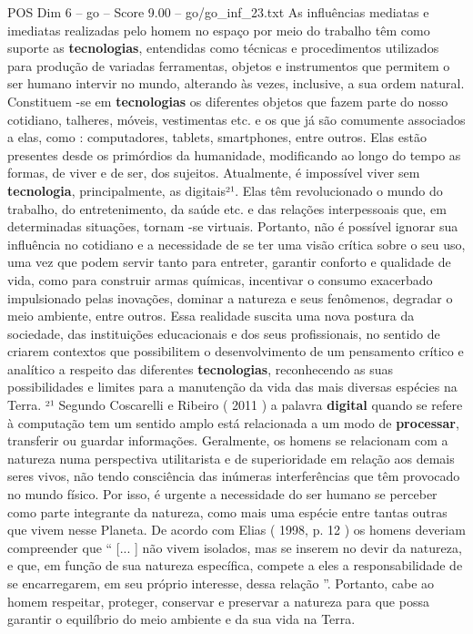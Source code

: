 \begin{textsample}{POS Dim 6 – go – Score 9.00 – go/go\_inf\_23.txt}
As influências mediatas e imediatas realizadas pelo homem no espaço por meio do trabalho têm como suporte as \textbf{tecnologias}, entendidas como técnicas e procedimentos utilizados para produção de variadas ferramentas, objetos e instrumentos que permitem o ser humano intervir no mundo, alterando às vezes, inclusive, a sua ordem natural.
Constituem -se em \textbf{tecnologias} os diferentes objetos que fazem parte do nosso cotidiano, talheres, móveis, vestimentas etc. e os que já são comumente associados a elas, como : computadores, tablets, smartphones, entre outros.
Elas estão presentes desde os primórdios da humanidade, modificando ao longo do tempo as formas, de viver e de ser, dos sujeitos.
Atualmente, é impossível viver sem \textbf{tecnologia}, principalmente, as digitais²¹.
Elas têm revolucionado o mundo do trabalho, do entretenimento, da saúde etc. e das relações interpessoais que, em determinadas situações, tornam -se virtuais.
Portanto, não é possível ignorar sua influência no cotidiano e a necessidade de se ter uma visão crítica sobre o seu uso, uma vez que podem servir tanto para entreter, garantir conforto e qualidade de vida, como para construir armas químicas, incentivar o consumo exacerbado impulsionado pelas inovações, dominar a natureza e seus fenômenos, degradar o meio ambiente, entre outros.
Essa realidade suscita uma nova postura da sociedade, das instituições educacionais e dos seus profissionais, no sentido de criarem contextos que possibilitem o desenvolvimento de um pensamento crítico e analítico a respeito das diferentes \textbf{tecnologias}, reconhecendo as suas possibilidades e limites para a manutenção da vida das mais diversas espécies na Terra. ²¹ Segundo Coscarelli e Ribeiro ( 2011 ) a palavra \textbf{digital} quando se refere à computação tem um sentido amplo está relacionada a um modo de \textbf{processar}, transferir ou guardar informações.
Geralmente, os homens se relacionam com a natureza numa perspectiva utilitarista e de superioridade em relação aos demais seres vivos, não tendo consciência das inúmeras interferências que têm provocado no mundo físico.
Por isso, é urgente a necessidade do ser humano se perceber como parte integrante da natureza, como mais uma espécie entre tantas outras que vivem nesse Planeta.
De acordo com Elias ( 1998, p. 12 ) os homens deveriam compreender que “ [... ] não vivem isolados, mas se inserem no devir da natureza, e que, em função de sua natureza específica, compete a eles a responsabilidade de se encarregarem, em seu próprio interesse, dessa relação ”.
Portanto, cabe ao homem respeitar, proteger, conservar e preservar a natureza para que possa garantir o equilíbrio do meio ambiente e da sua vida na Terra.

\end{textsample}
